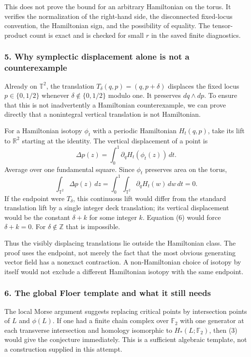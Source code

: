 \documentclass[11pt]{article}
\begin{document}
This does not prove the bound for an arbitrary Hamiltonian on the torus. It verifies the normalization of the right-hand side, the disconnected fixed-locus convention, the Hamiltonian sign, and the possibility of equality. The tensor-product count is exact and is checked for small $r$ in the saved finite diagnostics.

\subsubsection{5. Why symplectic displacement alone is not a counterexample}
Already on $\mathbb T^2$, the translation
$T_\delta(q,p)=(q,p+\delta)$ displaces the fixed locus $p\in\{0,1/2\}$ whenever $\delta\notin\{0,1/2\}$ modulo one. It preserves $dq\wedge dp$. To ensure that this is not inadvertently a Hamiltonian counterexample, we can prove directly that a nonintegral vertical translation is not Hamiltonian.

For a Hamiltonian isotopy $\phi_t$ with a periodic Hamiltonian $H_t(q,p)$, take its lift to $\mathbb R^2$ starting at the identity. The vertical displacement of a point is
\[
 \Delta p(z)=\int_0^1\partial_qH_t(\phi_t(z))\,dt.
\]
Average over one fundamental square. Since $\phi_t$ preserves area on the torus,
\[
 \int_{\mathbb T^2}\Delta p(z)\,dz
 =\int_0^1\int_{\mathbb T^2}\partial_qH_t(w)\,dw\,dt=0. \tag{6}
\]
If the endpoint were $T_\delta$, this continuous lift would differ from the standard translation lift by a single integer deck translation; its vertical displacement would be the constant $\delta+k$ for some integer $k$. Equation (6) would force $\delta+k=0$. For $\delta\notin\mathbb Z$ that is impossible.

Thus the visibly displacing translations lie outside the Hamiltonian class. The proof uses the endpoint, not merely the fact that the most obvious generating vector field has a nonexact contraction. A non-Hamiltonian choice of isotopy by itself would not exclude a different Hamiltonian isotopy with the same endpoint.

\subsubsection{6. The global Floer template and what it still needs}
The local Morse argument suggests replacing critical points by intersection points of $L$ and $\phi(L)$. If one had a finite chain complex over $\mathbb F_2$ with one generator at each transverse intersection and homology isomorphic to $H_*(L;\mathbb F_2)$, then (3) would give the conjecture immediately. This is a sufficient algebraic template, not a construction supplied in this attempt.
\end{document}
